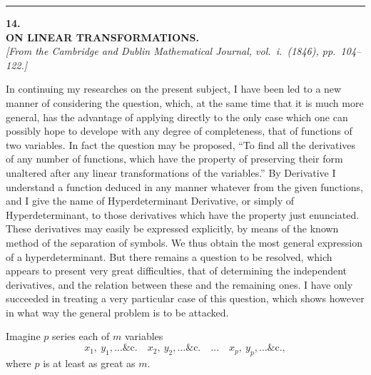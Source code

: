 \documentclass[11pt]{article}
\begin{document}
\bigskip
\hrule
\bigskip


\begin{center}
{\Large\bfseries 14.}\\[0.6em]
{\large\bfseries ON LINEAR TRANSFORMATIONS.}\\[0.4em]
\textit{[From the Cambridge and Dublin Mathematical Journal, vol.~i.~(1846), pp.~104--122.]}
\end{center}

\medskip

In continuing my researches on the present subject, I have been led to a new
manner of considering the question, which, at the same time that it is much more
general, has the advantage of applying directly to the only case which one can
possibly hope to develope with any degree of completeness, that of functions of two
variables. In fact the question may be proposed, ``To find all the derivatives of any
number of functions, which have the property of preserving their form unaltered after
any linear transformations of the variables.'' By Derivative I understand a function
deduced in any manner whatever from the given functions, and I give the name of
Hyperdeterminant Derivative, or simply of Hyperdeterminant, to those derivatives which
have the property just enunciated. These derivatives may easily be expressed explicitly,
by means of the known method of the separation of symbols. We thus obtain the
most general expression of a hyperdeterminant. But there remains a question to be
resolved, which appears to present very great difficulties, that of determining the
independent derivatives, and the relation between these and the remaining ones. I
have only succeeded in treating a very particular case of this question, which shows
however in what way the general problem is to be attacked.

Imagine $p$ series each of $m$ variables
\[
x_1,\ y_1,\ldots\&\text{c.}\quad x_2,\ y_2,\ldots\&\text{c.}\quad \ldots\quad x_p,\ y_p,\ldots\&\text{c.},
\]
where $p$ is at least as great as $m$.
\end{document}
